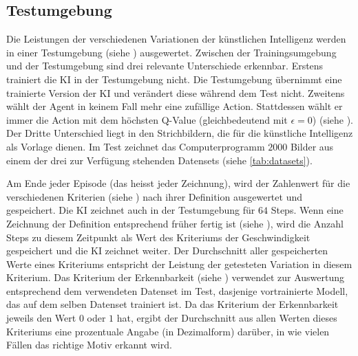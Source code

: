 \subsection{Testumgebung}\label{sub:m_auswert_test}
Die Leistungen der verschiedenen Variationen der künstlichen Intelligenz werden
in einer Testumgebung (siehe ) ausgewertet. Zwischen der
Trainingsumgebung und der Testumgebung sind drei relevante Unterschiede
erkennbar. Erstens trainiert die KI in der Testumgebung nicht. Die Testumgebung
übernimmt eine trainierte Version der KI und verändert diese während dem Test
nicht. Zweitens wählt der Agent in keinem Fall mehr eine zufällige Action.
Stattdessen wählt er immer die Action mit dem höchsten Q-Value (gleichbedeutend
mit $\epsilon = 0$) (siehe ). Der Dritte Unterschied
liegt in den Strichbildern, die für die künstliche Intelligenz als Vorlage
dienen. Im Test zeichnet das Computerprogramm $2000$ Bilder aus einem der drei
zur Verfügung stehenden Datensets (siehe \autoref{tab:datasets}). 

Am Ende jeder Episode (das heisst jeder Zeichnung), wird der Zahlenwert für die
verschiedenen Kriterien (siehe ) nach ihrer Definition
ausgewertet und gespeichert. Die KI zeichnet auch in der Testumgebung für $64$
Steps. Wenn eine Zeichnung der Definition entsprechend früher fertig ist (siehe
), wird die Anzahl Steps zu diesem Zeitpunkt als Wert
des Kriteriums der Geschwindigkeit gespeichert und die KI zeichnet weiter. Der
Durchschnitt aller gespeicherten Werte eines Kriteriums entspricht der Leistung
der getesteten Variation in diesem Kriterium. Das Kriterium der Erkennbarkeit
(siehe ) verwendet zur Auswertung entsprechend dem
verwendeten Datenset im Test, dasjenige vortrainierte Modell, das auf dem selben
Datenset trainiert ist. Da das Kriterium der Erkennbarkeit jeweils den Wert $0$
oder $1$ hat, ergibt der Durchschnitt aus allen Werten dieses Kriteriums eine
prozentuale Angabe (in Dezimalform) darüber, in wie vielen Fällen das richtige
Motiv erkannt wird.



